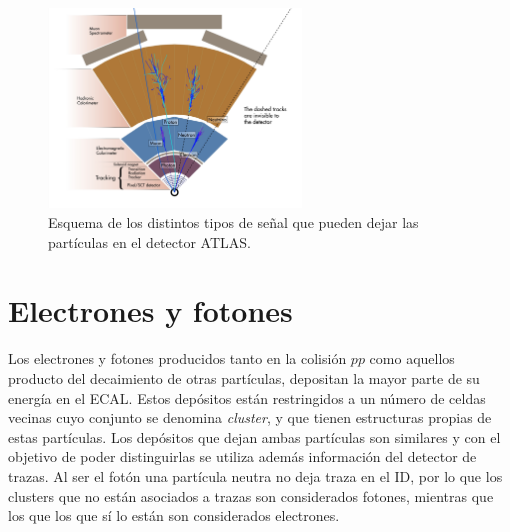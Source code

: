 \begin{figure}
\centering
  \includegraphics[width=0.6\textwidth]{images/cross_section_2-eps-converted-to.pdf}
\caption{Esquema de los distintos tipos de señal que pueden dejar las partículas en el detector ATLAS.  
}
\label{particulasATLAS}
\end{figure}

\section{Electrones y fotones}


Los electrones y fotones producidos tanto en la colisión $pp$ como aquellos producto del decaimiento de otras partículas, depositan la mayor parte de su energía en el ECAL. Estos depósitos están restringidos a un número de celdas vecinas cuyo conjunto se denomina \textit{cluster}, y que tienen estructuras propias de estas partículas. Los depósitos que dejan ambas partículas son similares y con el objetivo de poder distinguirlas se utiliza además información del detector de trazas. Al ser el fotón una partícula neutra no deja traza en el ID, por lo que los clusters que no están asociados a trazas son considerados fotones, mientras que los que los que sí lo están son considerados electrones. 

